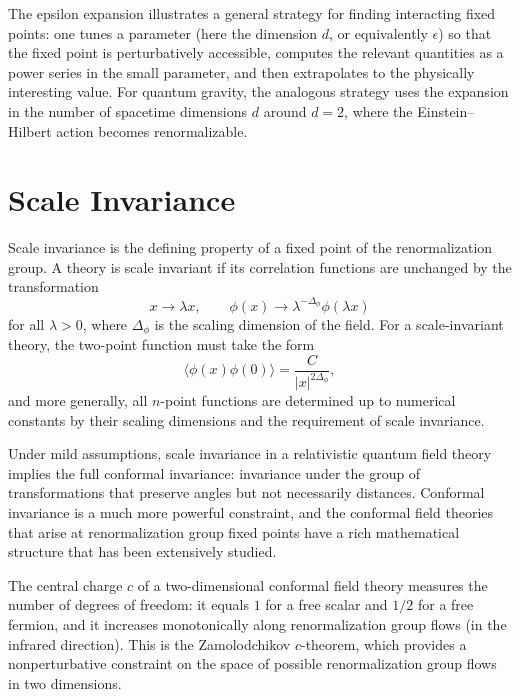 \documentclass[11pt, twoside, openright]{book}
\theoremstyle{dotted}
\theoremstyle{definition}
\begin{document}
The epsilon expansion illustrates a general strategy for finding interacting fixed
points: one tunes a parameter (here the dimension $d$, or equivalently $\epsilon$)
so that the fixed point is perturbatively accessible, computes the relevant
quantities as a power series in the small parameter, and then extrapolates to the
physically interesting value. For quantum gravity, the analogous strategy uses the
expansion in the number of spacetime dimensions $d$ around $d = 2$, where the
Einstein--Hilbert action becomes renormalizable.

\section{Scale Invariance}

Scale invariance is the defining property of a fixed point of the renormalization
group. A theory is scale invariant if its correlation functions are unchanged by
the transformation
\begin{equation}
  x \to \lambda x, \qquad \phi(x) \to \lambda^{-\Delta_\phi}\phi(\lambda x)
  \label{eq:scale_inv_transform}
\end{equation}
for all $\lambda > 0$, where $\Delta_\phi$ is the scaling dimension of the field.
For a scale-invariant theory, the two-point function must take the form
\begin{equation}
  \langle\phi(x)\phi(0)\rangle = \frac{C}{|x|^{2\Delta_\phi}},
  \label{eq:scale_inv_correlator}
\end{equation}
and more generally, all $n$-point functions are determined up to numerical
constants by their scaling dimensions and the requirement of scale invariance.

Under mild assumptions, scale invariance in a relativistic quantum field theory
implies the full conformal invariance: invariance under the group of transformations
that preserve angles but not necessarily distances. Conformal invariance is a much
more powerful constraint, and the conformal field theories that arise at renormalization
group fixed points have a rich mathematical structure that has been extensively
studied.

The central charge $c$ of a two-dimensional conformal field theory measures the
number of degrees of freedom: it equals $1$ for a free scalar and $1/2$ for a
free fermion, and it increases monotonically along renormalization group flows
(in the infrared direction). This is the Zamolodchikov $c$-theorem, which provides
a nonperturbative constraint on the space of possible renormalization group flows
in two dimensions.
\end{document}
